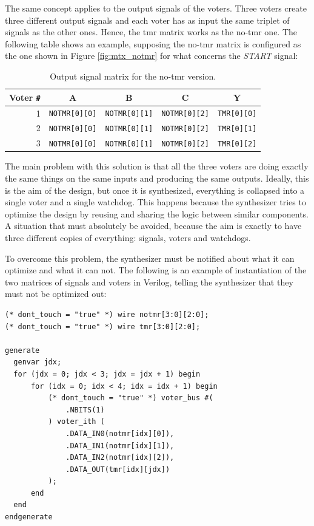 The same concept applies to the output signals of the voters. Three voters create three different output signals and each voter has as input the same triplet of signals as the other ones. Hence, the tmr matrix works as the no-tmr one. The following table shows an example, supposing the no-tmr matrix is configured as the one shown in Figure \ref{fig:mtx_notmr} for what concerns the \textit{START} signal:

\begin{table}[H]
\centering
\begin{tabular}{ r|ccc|c }
    \textbf{Voter \texttt{\#}}&\textbf{A}&\textbf{B}&\textbf{C}&\textbf{Y}\\
    \hline
    1 & \texttt{NOTMR[0][0]} & \texttt{NOTMR[0][1]} & \texttt{NOTMR[0][2]} & \texttt{TMR[0][0]}\\
    2 & \texttt{NOTMR[0][0]} & \texttt{NOTMR[0][1]} & \texttt{NOTMR[0][2]} & \texttt{TMR[0][1]}\\
    3 & \texttt{NOTMR[0][0]} & \texttt{NOTMR[0][1]} & \texttt{NOTMR[0][2]} & \texttt{TMR[0][2]}\\
\end{tabular}
\caption{Output signal matrix for the no-tmr version.}
\end{table}

The main problem with this solution is that all the three voters are doing exactly the same things on the same inputs and producing the same outputs. Ideally, this is the aim of the design, but once it is synthesized, everything is collapsed into a single voter and a single watchdog. This happens because the synthesizer tries to optimize the design by reusing and sharing the logic between similar components. A situation that must absolutely be avoided, because the aim is exactly to have three different copies of everything: signals, voters and watchdogs.\bigskip

To overcome this problem, the synthesizer must be notified about what it can optimize and what it can not. The following is an example of instantiation of the two matrices of signals and voters in Verilog, telling the synthesizer that they must not be optimized out:

\begin{lstlisting}[style=Verilog]
(* dont_touch = "true" *) wire notmr[3:0][2:0];
(* dont_touch = "true" *) wire tmr[3:0][2:0];

generate
  genvar jdx;
  for (jdx = 0; jdx < 3; jdx = jdx + 1) begin
      for (idx = 0; idx < 4; idx = idx + 1) begin
          (* dont_touch = "true" *) voter_bus #(
              .NBITS(1)
          ) voter_ith (
              .DATA_IN0(notmr[idx][0]),
              .DATA_IN1(notmr[idx][1]),
              .DATA_IN2(notmr[idx][2]),
              .DATA_OUT(tmr[idx][jdx])
          );
      end
  end
endgenerate
\end{lstlisting}


